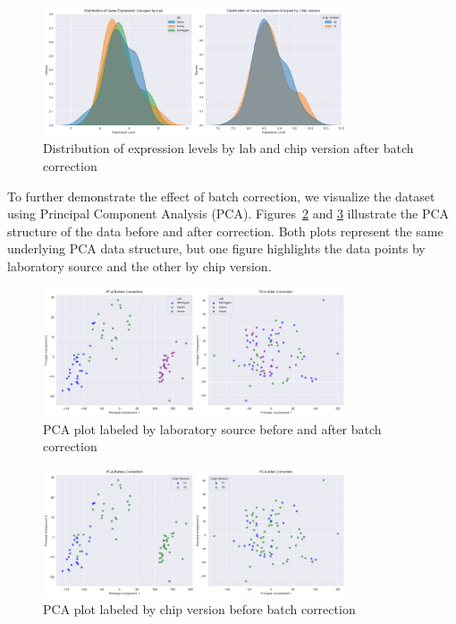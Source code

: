 \documentclass[12pt]{article}
\begin{document}
\begin{figure}[h!]
    \centering
    \includegraphics[width=0.8\textwidth]{image/batch_correction}
    \caption{Distribution of expression levels by lab and chip version after batch correction}
    \label{fig:batch_correction}
\end{figure}
\FloatBarrier

To further demonstrate the effect of batch correction, we visualize the dataset using Principal Component Analysis (PCA). Figures~\ref{fig:PCA_lab} and \ref{fig:PCA_chip} illustrate the PCA structure of the data before and after correction. Both plots represent the same underlying PCA data structure, but one figure highlights the data points by laboratory source and the other by chip version. 

\begin{figure}[h!]
    \centering
    \includegraphics[width=0.8\textwidth]{image/PCA_lab}
    \caption{PCA plot labeled by laboratory source before and after batch correction}
    \label{fig:PCA_lab}
\end{figure}
\FloatBarrier

\begin{figure}[h!]
    \centering
    \includegraphics[width=0.8\textwidth]{image/PCA_chip}
    \caption{PCA plot labeled by chip version before batch correction}
    \label{fig:PCA_chip}
\end{figure}
\FloatBarrier
\end{document}
